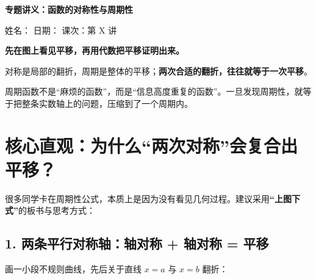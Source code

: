 \documentclass[11pt,a4paper]{ctexart}
\begin{document}
\begin{center}
  {\LARGE\bfseries 专题讲义：函数的对称性与周期性}\par
  \vspace{0.6em}
  {\small 姓名：\blank{2.5cm} \quad 日期：\blank{2.5cm} \quad 课次：第 X 讲}
\end{center}
\vspace{0.6em}

\begin{tcolorbox}[
  enhanced,
  colback=white,
  colframe=black,
  boxrule=0.8pt,
  arc=0pt,
  left=10pt, right=10pt, top=8pt, bottom=8pt,
  title={\small\bfseries 【核心教学哲学】}
]
  {\small
  \textbf{先在图上看见平移，再用代数把平移证明出来。}\par
  对称是局部的翻折，周期是整体的平移；\textbf{两次合适的翻折，往往就等于一次平移}。\par
  周期函数不是“麻烦的函数”，而是“信息高度重复的函数”。一旦发现周期性，就等于把整条实数轴上的问题，压缩到了一个周期内。
  }
\end{tcolorbox}

\section{核心直观：为什么“两次对称”会复合出平移？}

很多同学卡在周期性公式，本质上是因为没有看见几何过程。建议采用\textbf{“上图下式”}的板书与思考方式：

\subsection{1. 两条平行对称轴：轴对称 + 轴对称 = 平移}

画一小段不规则曲线，先后关于直线 $x=a$ 与 $x=b$ 翻折：
\end{document}

